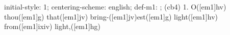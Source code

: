 initial-style: 1;
centering-scheme: english;
def-m1: \grealign;
(cb4) 1. O([em1]hv) thou([em1]g) that([em1]jv) bring-([em1]jv)est([em1]g) light([em1]hv) from([em1]ixiv) light,([em1]hg)